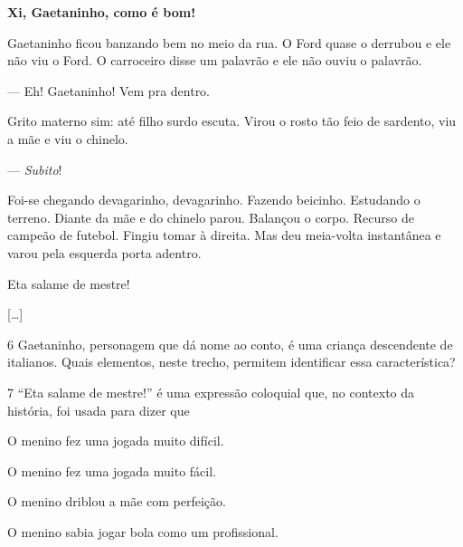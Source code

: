 \begin{myquote}
\begin{center}
\textbf{Xi, Gaetaninho, como é bom!}\\
\end{center}

\medskip

\noindent Gaetaninho ficou banzando bem no meio da rua. O Ford quase o derrubou e
ele não viu o Ford. O carroceiro disse um palavrão e ele não ouviu o
palavrão.

— Eh! Gaetaninho! Vem pra dentro.

Grito materno sim: até filho surdo escuta. Virou o rosto tão feio de
sardento, viu a mãe e viu o chinelo.

— \emph{Subito}!

Foi-se chegando devagarinho, devagarinho. Fazendo beicinho. Estudando o
terreno. Diante da mãe e do chinelo parou. Balançou o corpo. Recurso de
campeão de futebol. Fingiu tomar à direita. Mas deu meia-volta
instantânea e varou pela esquerda porta adentro.

Eta salame de mestre!

{[}\ldots{}{]}

\end{myquote}

\num{6} Gaetaninho, personagem que dá nome ao conto, é uma criança
descendente de italianos. Quais elementos, neste trecho, permitem
identificar essa característica?


\num{7} ``Eta salame de mestre!'' é uma expressão coloquial que, no
contexto da história, foi usada para dizer que

\begin{escolha}
\item O menino fez uma jogada muito difícil.
\item O menino fez uma jogada muito fácil.
\item O menino driblou a mãe com perfeição.
\item O menino sabia jogar bola como um profissional.
\end{escolha}

